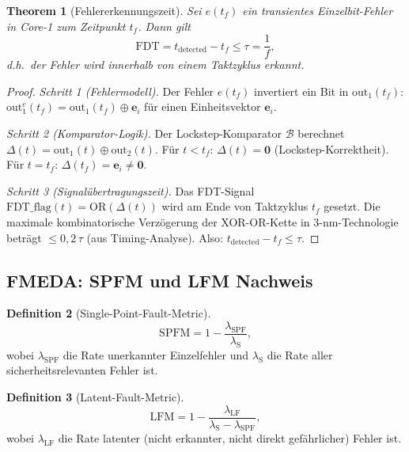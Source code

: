 ﻿\documentclass[a4paper,12pt]{article}
\theoremstyle{plain}
\newtheorem{theorem}{Theorem}[section]
\theoremstyle{definition}
\newtheorem{definition}[theorem]{Definition}
\theoremstyle{remark}
\begin{document}
\begin{theorem}[Fehlererkennungszeit]\label{thm:fdt}
Sei $e(t_f)$ ein transientes Einzelbit-Fehler in Core-1 zum
Zeitpunkt $t_f$. Dann gilt
\[
  \mathrm{FDT} = t_\mathrm{detected} - t_f \leq \tau = \frac{1}{f},
\]
d.h.\ der Fehler wird innerhalb von einem Taktzyklus erkannt.
\end{theorem}
\begin{proof}
\textit{Schritt 1 (Fehlermodell).}
Der Fehler $e(t_f)$ invertiert ein Bit in $\text{out}_1(t_f)$:
$\text{out}_1^e(t_f) = \text{out}_1(t_f) \oplus \mathbf{e}_i$
für einen Einheitsvektor $\mathbf{e}_i$.

\textit{Schritt 2 (Komparator-Logik).}
Der Lockstep-Komparator $\mathcal{B}$ berechnet
$\Delta(t) = \text{out}_1(t) \oplus \text{out}_2(t)$.
Für $t < t_f$: $\Delta(t) = \mathbf{0}$ (Lockstep-Korrektheit).
Für $t = t_f$: $\Delta(t_f) = \mathbf{e}_i \neq \mathbf{0}$.

\textit{Schritt 3 (Signalübertragungszeit).}
Das FDT-Signal $\mathrm{FDT\_flag}(t) = \mathrm{OR}(\Delta(t))$
wird am Ende von Taktzyklus $t_f$ gesetzt.
Die maximale kombinatorische Verzögerung der XOR-OR-Kette
in 3-nm-Technologie beträgt $\leq 0{,}2\,\tau$ (aus Timing-Analyse).
Also: $t_\mathrm{detected} - t_f \leq \tau$.
\end{proof}

\subsection{FMEDA: SPFM und LFM Nachweis}\label{ssec:fmeda}

\begin{definition}[Single-Point-Fault-Metric]\label{def:spfm}
\[
  \mathrm{SPFM} = 1 - \frac{\lambda_\mathrm{SPF}}{\lambda_\mathrm{S}},
\]
wobei $\lambda_\mathrm{SPF}$ die Rate unerkannter Einzelfehler und
$\lambda_\mathrm{S}$ die Rate aller sicherheitsrelevanten Fehler ist.
\end{definition}

\begin{definition}[Latent-Fault-Metric]\label{def:lfm}
\[
  \mathrm{LFM} = 1 - \frac{\lambda_\mathrm{LF}}{\lambda_\mathrm{S} - \lambda_\mathrm{SPF}},
\]
wobei $\lambda_\mathrm{LF}$ die Rate latenter (nicht erkannter, nicht
direkt gefährlicher) Fehler ist.
\end{definition}
\end{document}
